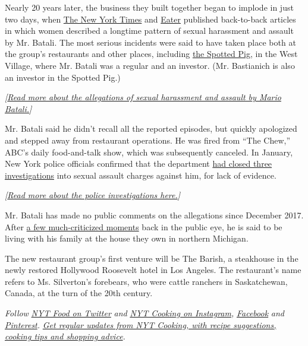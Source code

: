 Nearly 20 years later, the business they built together began to implode
in just two days, when
\href{https://www.nytimes3xbfgragh.onion/2017/12/12/dining/ken-friedman-sexual-harassment.html}{The
New York Times} and
\href{https://ny.eater.com/2017/12/11/16759540/mario-batali-sexual-misconduct-allegations}{Eater}
published back-to-back articles in which women described a longtime
pattern of sexual harassment and assault by Mr. Batali. The most serious
incidents were said to have taken place both at the group's restaurants
and other places, including
\href{https://www.nytimes3xbfgragh.onion/2018/08/20/dining/mario-batali-spotted-pig.html}{the
Spotted Pig}, in the West Village, where Mr. Batali was a regular and an
investor. (Mr. Bastianich is also an investor in the Spotted Pig.)

\emph{{[}}\href{https://www.nytimes3xbfgragh.onion/2017/12/12/dining/ken-friedman-sexual-harassment.html}{\emph{Read
more about the allegations of sexual harassment and assault by Mario
Batali.}}\emph{{]}}

Mr. Batali said he didn't recall all the reported episodes, but quickly
apologized and stepped away from restaurant operations. He was fired
from ``The Chew,'' ABC's daily food-and-talk show, which was
subsequently canceled. In January, New York police officials confirmed
that the department
\href{https://www.nytimes3xbfgragh.onion/2019/01/08/dining/mario-batali-sexual-assault-no-charges-nypd.html}{had
closed three investigations} into sexual assault charges against him,
for lack of evidence.

\emph{{[}}\href{https://www.nytimes3xbfgragh.onion/2019/01/08/dining/mario-batali-sexual-assault-no-charges-nypd.html}{\emph{Read
more about the police investigations here.}}\emph{{]}}

Mr. Batali has made no public comments on the allegations since December
2017. After
\href{https://www.nytimes3xbfgragh.onion/2018/04/02/dining/mario-batali-sexual-harassment.html}{a
few much-criticized moments} back in the public eye, he is said to be
living with his family at the house they own in northern Michigan.

The new restaurant group's first venture will be The Barish, a
steakhouse in the newly restored Hollywood Roosevelt hotel in Los
Angeles. The restaurant's name refers to Ms. Silverton's forebears, who
were cattle ranchers in Saskatchewan, Canada, at the turn of the 20th
century.

\emph{Follow} \href{https://twitter.com/nytfood}{\emph{NYT Food on
Twitter}} \emph{and}
\href{https://www.instagram.com/nytcooking/}{\emph{NYT Cooking on
Instagram}}\emph{,}
\href{https://www.facebookcorewwwi.onion/nytcooking/}{\emph{Facebook}}
\emph{and}
\href{https://www.pinterest.com/nytcooking/}{\emph{Pinterest}}\emph{.}
\href{https://www.nytimes3xbfgragh.onion/newsletters/cooking}{\emph{Get
regular updates from NYT Cooking, with recipe suggestions, cooking tips
and shopping advice}}\emph{.}

